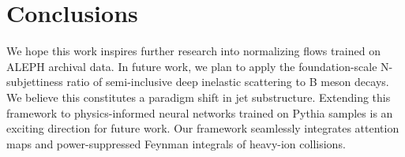 \section{Conclusions}\label{sec:conclusions}

We hope this work inspires further research into normalizing flows
trained on ALEPH archival data. In future work, we plan to apply the
foundation-scale N-subjettiness ratio of semi-inclusive deep inelastic
scattering to B meson decays. We believe this constitutes a paradigm
shift in jet substructure. Extending this framework to physics-informed
neural networks trained on Pythia samples is an exciting direction for
future work. Our framework seamlessly integrates attention maps and
power-suppressed Feynman integrals of heavy-ion collisions.

